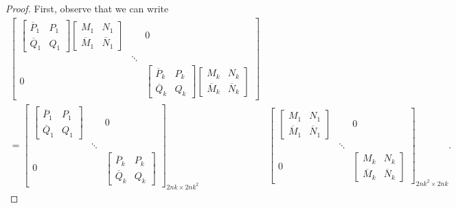 \documentclass[10pt,reqno,oneside,a4paper]{article}
\begin{document}
\begin{proof}
First, observe that we can write 
\begin{equation}\label{P2.CA-lemma-eq1}
\begin{aligned}
\begin{bmatrix}
\begin{bmatrix}
\overline{P}_1 & P_1 \\
\overline{Q}_1 & Q_1 
\end{bmatrix} 
\begin{bmatrix}
M_1 & N_1  \\
\overline{M}_1 & \overline{N}_1 
\end{bmatrix} & & 0 \\
 & \ddots & \\
0 & & \begin{bmatrix}
\overline{P}_k & P_k \\
\overline{Q}_k & Q_k 
\end{bmatrix} 
\begin{bmatrix}
M_k & N_k  \\
\overline{M}_k & \overline{N}_k 
\end{bmatrix}
\end{bmatrix} \\
= 
\begin{bmatrix}
\begin{bmatrix}
\overline{P}_1 & P_1 \\
\overline{Q}_1 & Q_1 
\end{bmatrix} 
 & & 0 \\
 & \ddots & \\
0 & & \begin{bmatrix}
\overline{P}_k & P_k \\
\overline{Q}_k & Q_k 
\end{bmatrix} 
\end{bmatrix}_{2nk \times 2nk^2}&
\begin{bmatrix}
\begin{bmatrix}
M_1 & N_1  \\
\overline{M}_1 & \overline{N}_1 
\end{bmatrix} & & 0 \\
 & \ddots & \\
0 & & 
\begin{bmatrix}
M_k & N_k  \\
\overline{M}_k & \overline{N}_k 
\end{bmatrix}
\end{bmatrix}_{2nk^2 \times 2nk}.
\end{aligned}

\end{equation}
\end{proof}
\end{document}
